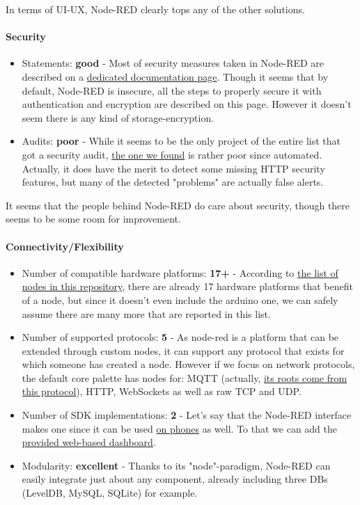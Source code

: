 \documentclass{article}
\begin{document}
In terms of UI-UX, Node-RED clearly tops any of the other solutions.

\paragraph{Security}

\begin{itemize}
\item Statements: \textbf{good} - Most of security measures taken  in Node-RED are described on a \href{https://nodered.org/docs/security}{dedicated documentation page}. Though it seems that by default, Node-RED is insecure, all the steps to properly secure it with authentication and encryption are described on this page. However it doesn't seem there is any kind of storage-encryption.
\item Audits: \textbf{poor} - While it seems to be the only project of the entire list that got a security audit, \href{http://www.isgroup.it/node.security/audit-node-red.html}{the one we found} is rather poor since automated. Actually, it does have the merit to detect some missing HTTP security features, but many of the detected "problems" are actually false alerts.
\end{itemize}

It seems that the people behind Node-RED do care about security, though there seems to be some room for improvement.

\paragraph{Connectivity/Flexibility}

\begin{itemize}
\item Number of compatible hardware platforms: \textbf{17+} - According to \href{https://github.com/node-red/node-red-nodes}{the list of nodes in this repository}, there are already 17 hardware platforms that benefit of a node, but since it doesn't even include the arduino one, we can safely assume there are many more that are reported in this list.
\item Number of supported protocols: \textbf{5} - As node-red is a platform that can be extended through custom nodes, it can support any protocol that exists for which someone has created a node. However if we focus on network protocols, the default core palette has nodes for: MQTT (actually, \href{https://nodered.org/about/}{its roots come from this protocol}), HTTP, WebSockets as well as raw TCP and UDP.
\item Number of SDK implementations: \textbf{2} - Let's say that the Node-RED interface makes one since it can be used \href{https://nodered.org/docs/platforms/android}{on phones} as well. To that we can add the \href{https://github.com/node-red/node-red-dashboard}{provided web-based dashboard}.
\item Modularity: \textbf{excellent} - Thanks to its "node"-paradigm, Node-RED can easily integrate just about any component, already including three DBs (LevelDB, MySQL, SQLite) for example.
\end{itemize}
\end{document}
